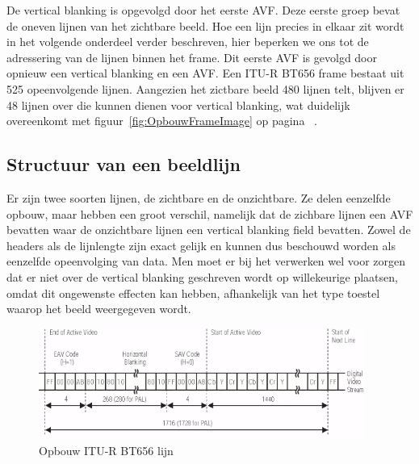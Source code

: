 		\par De vertical blanking is opgevolgd door het eerste AVF. Deze eerste groep bevat de oneven lijnen van het zichtbare beeld.
		Hoe een lijn precies in elkaar zit wordt in het volgende onderdeel verder beschreven, hier beperken we ons tot de adressering van de lijnen binnen het frame. Dit eerste AVF is gevolgd door opnieuw een vertical blanking en een AVF. Een ITU-R BT656 frame bestaat uit 525 opeenvolgende lijnen. Aangezien het zictbare beeld 480 lijnen telt, blijven er 48 lijnen over die kunnen dienen voor vertical blanking, wat duidelijk overeenkomt met figuur~\ref{fig:OpbouwFrameImage} op pagina ~\pageref{fig:OpbouwFrameImage}.

	\subsection{Structuur van een beeldlijn}
	\label{subsec:LijnSubSec}
		\par Er zijn twee soorten lijnen, de zichtbare en de onzichtbare. Ze delen eenzelfde opbouw, maar hebben een groot verschil, namelijk dat de zichbare lijnen een AVF bevatten waar de onzichtbare lijnen een vertical blanking field bevatten. Zowel de headers als de lijnlengte zijn exact gelijk en kunnen dus beschouwd worden als eenzelfde opeenvolging van data. Men moet er bij het verwerken wel voor zorgen dat er niet over de vertical blanking geschreven wordt op willekeurige plaatsen, omdat dit ongewenste effecten kan hebben, afhankelijk van het type toestel waarop het beeld weergegeven wordt.

		\begin{figure}[H]
			\centering
			\includegraphics[width=0.95\textwidth]{Chapters/Chapter1/Images/Line.png}
			\caption{Opbouw ITU-R BT656 lijn ~\cite{bib_16}}
			\label{fig:OpbouwLijnImage}
		\end{figure}

